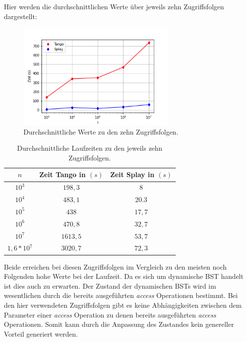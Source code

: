 \documentclass[a4paper,12pt]{article}
\begin{document}
\noindent Hier werden die durchschnittlichen Werte über jeweils zehn Zugriffsfolgen dargestellt:
\begin{figure}[H]
	\centering
	\includegraphics[width=0.7\textwidth]{"Medien/laufzeittest/diagramm/randomaccess"}
	\caption{Durchschnittliche Werte zu den zehn Zugriffsfolgen.}
	
\end{figure}
\begin{table}[H]
	\begin{center}
		\begin{tabular}[c]{|c|c|c|}
			\hline
			$n$ & Zeit Tango in $\left(s\right)$ &Zeit Splay in $\left(s\right)$ \\
			\hline
			$10^3$ & $198,3$ &$8$ \\
			\hline
			$10^4$  & $483,1$ &$20.3$  \\
			\hline
			$10^5$  & $438$ &$17,7$  \\
			\hline
			$10^6$  & $470,8$ &$32,7$  \\
			\hline
			$10^7$  & $1613,5$ &$53,7$  \\
			\hline
			$1,6 * 10^7$  & $3020,7$ &$72,3$  \\
			\hline
		\end{tabular}
		\caption{Durchschnittliche Laufzeiten zu den jeweils zehn Zugriffsfolgen.} 
	\end{center}
\end{table}
\noindent Beide erreichen bei diesen Zugriffsfolgen im Vergleich zu den meisten noch Folgenden hohe Werte bei der Laufzeit. Da es sich um dynamische BST handelt ist dies auch zu erwarten. Der Zustand der dynamischen BSTs wird im wesentlichen durch  die  bereits ausgeführten \textit{access} Operationen bestimmt. Bei den hier verwendeten Zugriffsfolgen gibt es keine Abhängigkeiten zwischen dem Parameter einer \textit{access} Operation zu denen bereits ausgeführten \textit{access} Operationen. Somit kann durch die Anpassung des Zustandes kein genereller Vorteil generiert werden.\\
\end{document}

